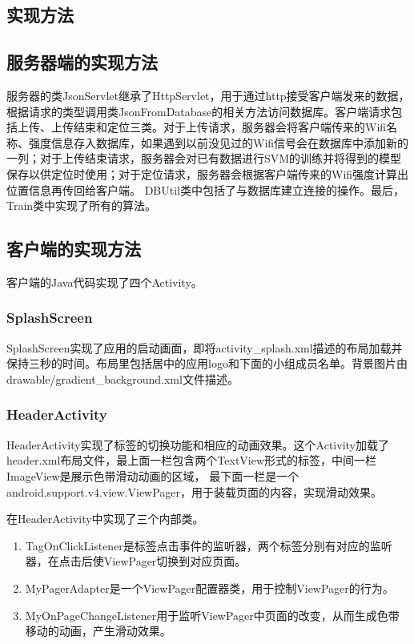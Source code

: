 \documentclass[a4paper,10pt]{article}
\begin{document}
\begin{CJK*}{UTF8}{gbsn}
\section{实现方法}
  \subsection{服务器端的实现方法}
    服务器的类JsonServlet继承了HttpServlet，用于通过http接受客户端发来的数据，根据请求的类型调用类JsonFromDatabase的相关方法访问数据库。客户端请求包括上传、上传结束和定位三类。对于上传请求，服务器会将客户端传来的Wifi名称、强度信息存入数据库，如果遇到以前没见过的Wifi信号会在数据库中添加新的一列；对于上传结束请求，服务器会对已有数据进行SVM的训练并将得到的模型保存以供定位时使用；对于定位请求，服务器会根据客户端传来的Wifi强度计算出位置信息再传回给客户端。
    DBUtil类中包括了与数据库建立连接的操作。最后，Train类中实现了所有的算法。
    
  \subsection{客户端的实现方法}
  客户端的Java代码实现了四个Activity。
    \subsubsection{SplashScreen}
    SplashScreen实现了应用的启动画面，即将activity\_splash.xml描述的布局加载并保持三秒的时间。布局里包括居中的应用logo和下面的小组成员名单。背景图片由
    drawable/gradient\_background.xml文件描述。
    \subsubsection{HeaderActivity}
    HeaderActivity实现了标签的切换功能和相应的动画效果。这个Activity加载了header.xml布局文件，最上面一栏包含两个TextView形式的标签，中间一栏ImageView是展示色带滑动动画的区域，
    最下面一栏是一个android.support.v4.view.ViewPager，用于装载页面的内容，实现滑动效果。
    
    在HeaderActivity中实现了三个内部类。
    \begin{enumerate}[1)]
     \item TagOnClickListener是标签点击事件的监听器，两个标签分别有对应的监听器，在点击后使ViewPager切换到对应页面。
     \item MyPagerAdapter是一个ViewPager配置器类，用于控制ViewPager的行为。
     \item MyOnPageChangeListener用于监听ViewPager中页面的改变，从而生成色带移动的动画，产生滑动效果。
    \end{enumerate}


\end{CJK*}
\end{document}
